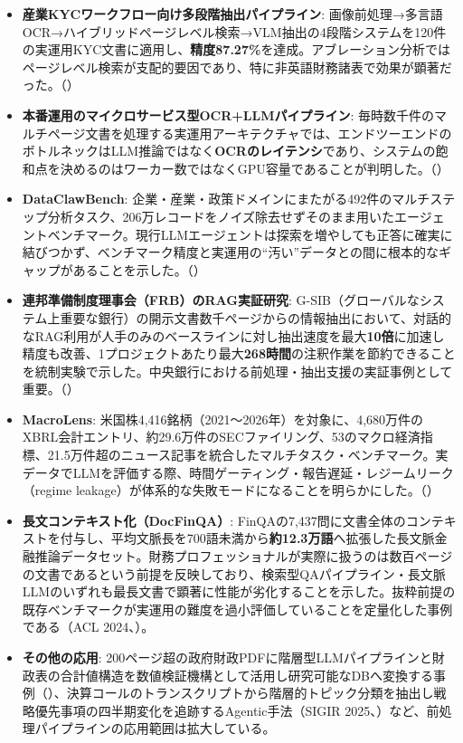\begin{itemize}
  \item \textbf{産業KYCワークフロー向け多段階抽出パイプライン}: 画像前処理→多言語OCR→ハイブリッドページレベル検索→VLM抽出の4段階システムを120件の実運用KYC文書に適用し、\textbf{精度87.27\%}を達成。アブレーション分析ではページレベル検索が支配的要因であり、特に非英語財務諸表で効果が顕著だった。（\cite{multistageextraction2026}）
  \item \textbf{本番運用のマイクロサービス型OCR+LLMパイプライン}: 毎時数千件のマルチページ文書を処理する実運用アーキテクチャでは、エンドツーエンドのボトルネックはLLM推論ではなく\textbf{OCRのレイテンシ}であり、システムの飽和点を決めるのはワーカー数ではなくGPU容量であることが判明した。（\cite{documentai2026}）
  \item \textbf{DataClawBench}: 企業・産業・政策ドメインにまたがる492件のマルチステップ分析タスク、206万レコードをノイズ除去せずそのまま用いたエージェントベンチマーク。現行LLMエージェントは探索を増やしても正答に確実に結びつかず、ベンチマーク精度と実運用の“汚い”データとの間に根本的なギャップがあることを示した。（\cite{dataclawbench2026}）
  \item \textbf{連邦準備制度理事会（FRB）のRAG実証研究}: G-SIB（グローバルなシステム上重要な銀行）の開示文書数千ページからの情報抽出において、対話的なRAG利用が人手のみのベースラインに対し抽出速度を最大\textbf{10倍}に加速し精度も改善、1プロジェクトあたり最大\textbf{268時間}の注釈作業を節約できることを統制実験で示した。中央銀行における前処理・抽出支援の実証事例として重要。（\cite{fedreserverag2025}）
  \item \textbf{MacroLens}: 米国株4,416銘柄（2021〜2026年）を対象に、4,680万件のXBRL会計エントリ、約29.6万件のSECファイリング、53のマクロ経済指標、21.5万件超のニュース記事を統合したマルチタスク・ベンチマーク。実データでLLMを評価する際、時間ゲーティング・報告遅延・レジームリーク（regime leakage）が体系的な失敗モードになることを明らかにした。（\cite{macrolens2026}）
  \item \textbf{長文コンテキスト化（DocFinQA）}: FinQAの7,437問に文書全体のコンテキストを付与し、平均文脈長を700語未満から\textbf{約12.3万語}へ拡張した長文脈金融推論データセット。財務プロフェッショナルが実際に扱うのは数百ページの文書であるという前提を反映しており、検索型QAパイプライン・長文脈LLMのいずれも最長文書で顕著に性能が劣化することを示した。抜粋前提の既存ベンチマークが実運用の難度を過小評価していることを定量化した事例である（ACL 2024、\cite{x02docfinqa2024}）。
  \item \textbf{その他の応用}: 200ページ超の政府財政PDFに階層型LLMパイプラインと財政表の合計値構造を数値検証機構として活用し研究可能なDBへ変換する事例（\cite{fiscaldocs2025}）、決算コールのトランスクリプトから階層的トピック分類を抽出し戦略優先事項の四半期変化を追跡するAgentic手法（SIGIR 2025、\cite{earningscalls2025}）など、前処理パイプラインの応用範囲は拡大している。
\end{itemize}

